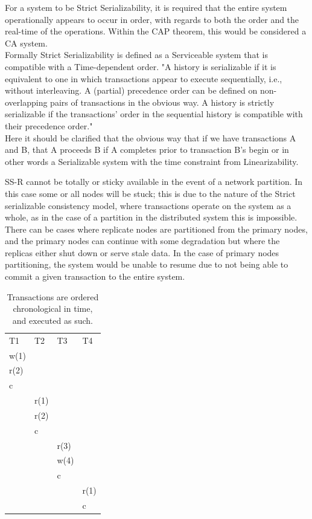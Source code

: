 \documentclass[a4paper,10pt,titlepage]{report}
\begin{document}
    For a system to be Strict Serializability, it is required that the entire system operationally appears to occur in order, with regards to both the order and the real-time of the operations. Within the CAP theorem, this would be considered a CA system.\\
    \vspace{5mm}
    Formally Strict Serializability is defined as a Serviceable system that is compatible with a Time-dependent order.
    "A history is serializable if it is equivalent to one in which transactions appear to execute sequentially, i.e., without interleaving. A (partial) precedence order can be defined on non-overlapping pairs of transactions in the obvious way. A history is strictly serializable if the transactions' order in the sequential history is compatible with their precedence order." \cite{Herlihy1990Linearizability}\\
    \vspace{5mm}
    Here it should be clarified that the obvious way that if we have transactions A and B, that A proceeds B if A completes prior to transaction B's begin or in other words a Serializable system with the time constraint from Linearizability.

    SS-R cannot be totally or sticky available in the event of a network partition. In this case some or all nodes will be stuck; this is due to the nature of the Strict serializable consistency model, where transactions operate on the system as a whole, as in the case of a partition in the distributed system this is impossible. There can be cases where replicate nodes are partitioned from the primary nodes, and the primary nodes can continue with some degradation but where the replicas either shut down or serve stale data. In the case of primary nodes partitioning, the system would be unable to resume due to not being able to commit a given transaction to the entire system.


    \begin{table}[h]
        \begin{tabular}{l|l|l|l}
            T1   & T2   & T3   & T4   \\
            w(1) &      &      &      \\
            r(2) &      &      &      \\
            c    &      &      &      \\
            & r(1) &      &      \\
            & r(2) &      &      \\
            & c    &      &      \\
            &      & r(3) &      \\
            &      & w(4) &      \\
            &      & c    &      \\
            &      &      & r(1) \\
            &      &      & c
        \end{tabular}
        \caption{Transactions are ordered chronological in time, and executed as such.}

    \end{table}
\end{document}
